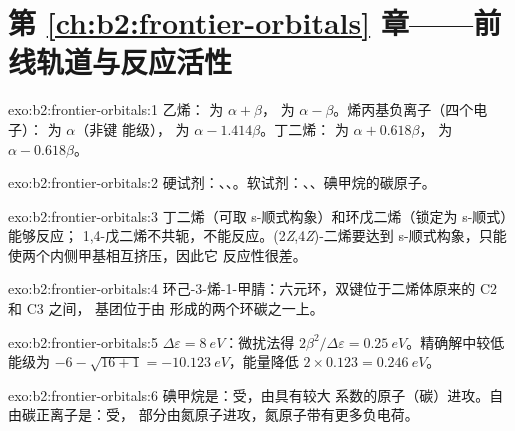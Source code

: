\section*{第 \ref{ch:b2:frontier-orbitals} 章——前线轨道与反应活性}

\begin{solution}{exo:b2:frontier-orbitals:1}
乙烯： 为 $\alpha + \beta$， 为 $\alpha - \beta$。烯丙基负离子（四个电子）： 为 $\alpha$（非键
能级）， 为 $\alpha - 1.414\beta$。丁二烯： 为 $\alpha + 0.618\beta$， 为 $\alpha -
0.618\beta$。
\end{solution}

\begin{solution}{exo:b2:frontier-orbitals:2}
硬试剂：、、。软试剂：、、碘甲烷的碳原子。
\end{solution}

\begin{solution}{exo:b2:frontier-orbitals:3}
丁二烯（可取 s-顺式构象）和环戊二烯（锁定为 s-顺式）能够反应；
1,4-戊二烯不共轭，不能反应。(2\textit{Z},4\textit{Z})-二烯要达到
s-顺式构象，只能使两个内侧甲基相互挤压，因此它
反应性很差。
\end{solution}

\begin{solution}{exo:b2:frontier-orbitals:4}
环己-3-烯-1-甲腈：六元环，双键位于二烯体原来的 C2
和 C3 之间， 基团位于由
形成的两个环碳之一上。
\end{solution}

\begin{solution}{exo:b2:frontier-orbitals:5}
$\Delta\varepsilon = \qty{8}{eV}$：微扰法得 $2\beta^2/\Delta\varepsilon = \qty{0.25}{eV}$。精确解中较低能级为
$-6 - \sqrt{16 + 1} = \qty{-10.123}{eV}$，能量降低 $2 \times 0.123 = \qty{0.246}{eV}$。
\end{solution}

\begin{solution}{exo:b2:frontier-orbitals:6}
碘甲烷是：受，由具有较大
 系数的原子（碳）进攻。自由碳正离子是：受，
部分由氮原子进攻，氮原子带有更多负电荷。
\end{solution}

